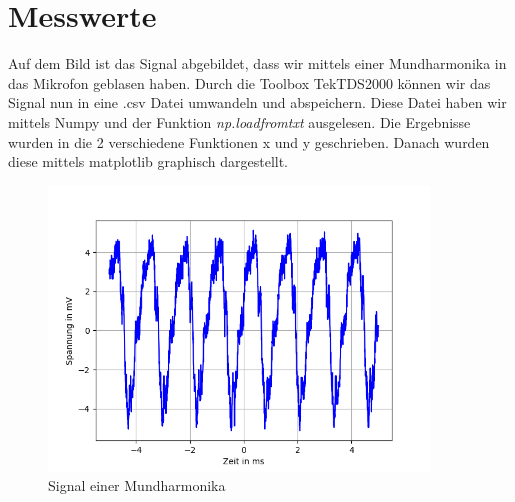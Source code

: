 \documentclass[12pt, oneside, a4paper, \docLanguage]{report}
\begin{document}
\section{Messwerte}
\label{chap:VERSUCH_1_MESSWERTE}
Auf dem Bild ist das Signal abgebildet, dass wir mittels einer Mundharmonika in das Mikrofon geblasen haben.
\newline
Durch die Toolbox TekTDS2000 können wir das Signal nun in eine .csv Datei umwandeln und abspeichern.
\newline
Diese Datei haben wir mittels Numpy und der Funktion \textit{np.loadfromtxt} ausgelesen.
Die Ergebnisse wurden in die 2 verschiedene Funktionen x und y geschrieben.
\newline
Danach wurden diese mittels matplotlib graphisch dargestellt.
\begin{figure}[H]
	\centering\small
	\includegraphics[width=0.9\textwidth]{../data/img/mundharmonika.png}
	\caption{Signal einer Mundharmonika}
	\label{img:Signal einer Mundharmonika}
\end{figure}
\newpage
\end{document}

